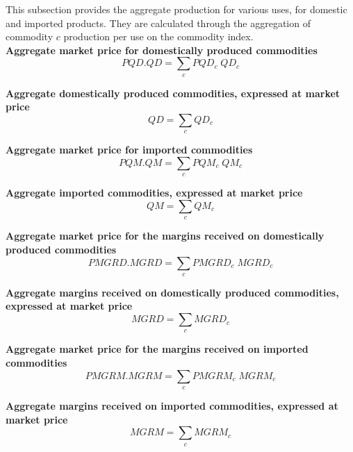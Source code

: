 \documentclass[12pt]{article}
\numberwithin{equation}{section}
\begin{document}
This subsection provides the aggregate production for various uses, for domestic and imported products. They are calculated through the aggregation of commodity $c$ production per use on the commodity index. \\

\noindent\textbf{Aggregate market price for domestically produced commodities} \\
\begin{dmath}
PQD . QD = \sum_{c} PQD_{c} \; QD_{c}
\end{dmath}

\noindent\textbf{Aggregate domestically produced commodities, expressed at market price} \\
\begin{dmath}
QD = \sum_{c} QD_{c}
\end{dmath}

\noindent\textbf{Aggregate market price for imported commodities} \\
\begin{dmath}
PQM . QM = \sum_{c} PQM_{c} \; QM_{c}
\end{dmath}

\noindent\textbf{Aggregate imported commodities, expressed at market price} \\
\begin{dmath}
QM = \sum_{c} QM_{c}
\end{dmath}

\noindent\textbf{Aggregate market price for the margins received on domestically produced commodities} \\
\begin{dmath}
PMGRD . MGRD = \sum_{c} PMGRD_{c} \; MGRD_{c}
\end{dmath}

\noindent\textbf{Aggregate margins received on domestically produced commodities, expressed at market price} \\
\begin{dmath}
MGRD = \sum_{c} MGRD_{c}
\end{dmath}

\noindent\textbf{Aggregate market price for the margins received on imported commodities} \\
\begin{dmath}
PMGRM . MGRM = \sum_{c} PMGRM_{c} \; MGRM_{c}
\end{dmath}

\noindent\textbf{Aggregate margins received on imported commodities, expressed at market price} \\
\begin{dmath}
MGRM = \sum_{c} MGRM_{c}
\end{dmath}
\end{document}
